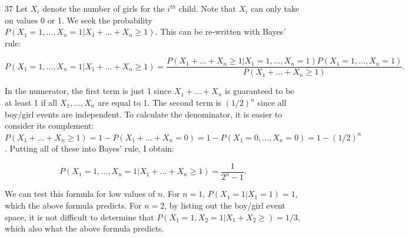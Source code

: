 \begin{problem} {37} Let $X_i$ denote the number of girls for the $i^{th}$ child.  Note that $X_i$ can only take on values 0 or 1.  We seek the probability $P(X_{1} =1, \ldots, X_{n} =1|X_1+ \ldots +X_n \ge 1)$.  This can be re-written with Bayes' rule:

\begin{equation}
P(X_{1} =1, \ldots, X_{n} =1|X_1+ \ldots +X_n \ge 1)= \frac{P(X_1+ \ldots +X_n \ge 1|X_{1} =1, \ldots, X_{n} =1)P(X_1=1, \ldots, X_n=1)}{P(X_1+ \ldots +X_n \ge 1)}.
\end{equation}

In the numerator, the first term is just 1 since $X_1+\ldots +X_n$ is guaranteed to be at least 1 if all $X_1, \ldots, X_n$ are equal to 1.  The second term is $(1/2)^n$ since all boy/girl events are independent.  To calculate the denominator, it is easier to consider its complement: $P(X_1+ \ldots +X_n \ge 1) = 1 - P(X_1+ \ldots +X_n=0)=1-P(X_1=0, \ldots, X_n=0)=1-(1/2)^n$.  Putting all of these into Bayes' rule, I obtain:


\begin{equation*}
P(X_{1} =1, \ldots, X_{n} =1|X_1+ \ldots +X_n \ge 1)= \frac{1}{2^n-1}.
\end{equation*}

We can test this formula for low values of $n$.  For $n=1$, $P(X_1=1|X_1=1) =1$, which the above formula predicts.  For $n=2$, by listing out the boy/girl event space,  it is not difficult to determine that $P(X_1=1, X_2=1| X_1+X_2\ge) = 1/3$, which also what the above formula predicts.

\end{problem}

